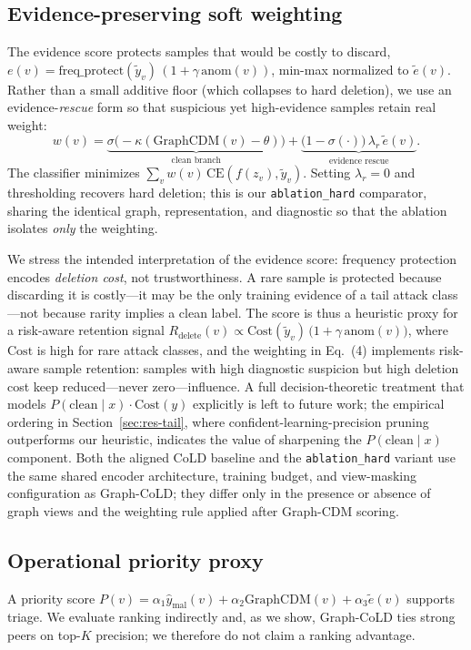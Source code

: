 \documentclass[preprint,3p,times]{elsarticle}
\begin{document}
\subsection{Evidence-preserving soft weighting}
The evidence score protects samples that would be costly to discard,
$e(v)=\text{freq\_protect}(\tilde{y}_v)\,(1+\gamma\,\text{anom}(v))$, min-max
normalized to $\tilde{e}(v)$. Rather than a small additive floor (which collapses
to hard deletion), we use an evidence-\emph{rescue} form so that suspicious yet
high-evidence samples retain real weight:
\begin{equation}
w(v)=\underbrace{\sigma\!\big(-\kappa(\mathrm{GraphCDM}(v)-\theta)\big)}_{\text{clean branch}}
+\underbrace{\big(1-\sigma(\cdot)\big)\,\lambda_{r}\,\tilde{e}(v)}_{\text{evidence rescue}} .
\end{equation}
The classifier minimizes $\sum_v w(v)\,\mathrm{CE}(f(z_v),\tilde{y}_v)$. Setting
$\lambda_r=0$ and thresholding recovers hard deletion; this is our
\texttt{ablation\_hard} comparator, sharing the identical graph, representation,
and diagnostic so that the ablation isolates \emph{only} the weighting.

We stress the intended interpretation of the evidence score: frequency
protection encodes \emph{deletion cost}, not trustworthiness. A rare sample is
protected because discarding it is costly---it may be the only training
evidence of a tail attack class---not because rarity implies a clean label.
The score is thus a heuristic proxy for a risk-aware retention signal
$R_{\text{delete}}(v)\propto \mathrm{Cost}(\tilde{y}_v)\,\big(1+\gamma\,\text{anom}(v)\big)$,
where $\mathrm{Cost}$ is high for rare attack classes, and the weighting in
Eq.~(4) implements risk-aware sample retention: samples with high diagnostic
suspicion but high deletion cost keep reduced---never zero---influence.
A full decision-theoretic treatment that models
$P(\text{clean}\mid x)\cdot\mathrm{Cost}(y)$ explicitly is left to future work;
the empirical ordering in Section~\ref{sec:res-tail}, where
confident-learning-precision pruning outperforms our heuristic, indicates the
value of sharpening the $P(\text{clean}\mid x)$ component.
Both the aligned CoLD baseline and the \texttt{ablation\_hard} variant use the
same shared encoder architecture, training budget, and view-masking configuration
as Graph-CoLD; they differ only in the presence or absence of graph views and the
weighting rule applied after Graph-CDM scoring.

\subsection{Operational priority proxy}
A priority score $P(v)=\alpha_1\hat{y}_{\text{mal}}(v)+\alpha_2\mathrm{GraphCDM}(v)
+\alpha_3\tilde{e}(v)$ supports triage. We evaluate ranking indirectly and, as we
show, Graph-CoLD ties strong peers on top-$K$ precision; we therefore do not claim
a ranking advantage.
\end{document}
